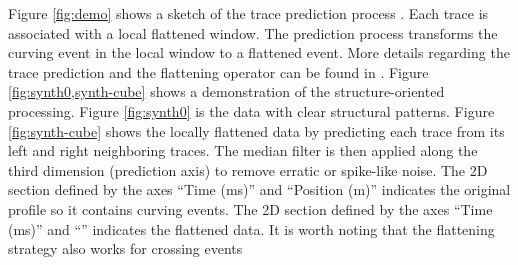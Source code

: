 Figure \ref{fig:demo} shows a sketch of the trace prediction process . Each trace is associated with a local flattened window. The prediction process transforms the curving event in the local window to a flattened event. More details regarding the trace prediction and the flattening operator can be found in \cite{liuyang2010}. Figure \ref{fig:synth0,synth-cube} shows a demonstration of the structure-oriented processing. Figure \ref{fig:synth0} is the data with clear structural patterns. Figure \ref{fig:synth-cube} shows the locally flattened data  by predicting each trace from its left and right neighboring traces. The median filter is then applied along the third dimension (prediction axis) to remove erratic or spike-like noise. The 2D section defined by the axes ``Time (ms)'' and ``Position (m)'' indicates the original profile so it contains curving events.  The 2D section defined by the axes ``Time (ms)'' and ``'' indicates the flattened data.   It is worth noting that the flattening strategy also works for crossing events


